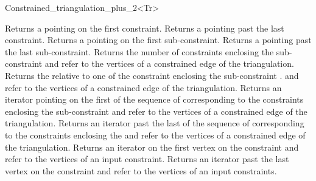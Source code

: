 \begin{ccRefClass}{Constrained_triangulation_plus_2<Tr>}
{
{Returns a  pointing on the first
constraint.}
\ccGlue
{}
{Returns a  pointing past the last
constraint.}
\ccGlue
{}
{Returns a  pointing on the first
sub-constraint.}
\ccGlue
{}
{Returns a  pointing past the last
sub-constraint.}
\ccGlue
{}
{Returns the number of constraints enclosing the sub-constraint
\ccPrecond {} and  refer to  the vertices
of a constrained edge of the triangulation.}
\ccGlue
{}
{Returns the   relative to  one of the constraint 
enclosing  the sub-constraint  .
\ccPrecond {} and  refer to  the vertices
of a constrained edge of the triangulation.}
\ccGlue
{}
{Returns an iterator pointing on the first 
of the sequence of 
corresponding to the constraints enclosing the sub-constraint
\ccPrecond {} and  refer to  the vertices
of a constrained edge of the triangulation.}
\ccGlue
{}
{Returns an iterator past the last  
of the sequence of 
corresponding to the constraints enclosing the  
\ccPrecond {} and  refer to  the vertices
of a constrained edge of the triangulation.}
\ccGlue
{}
{Returns an iterator on the first vertex on the constraint
\ccPrecond {} and  refer to  the vertices
of an input constraint.}
\ccGlue
{}
{Returns an iterator past  the last  vertex on  the constraint
\ccPrecond {} and  refer to  the vertices
of an input constraints.}


\ccSeeAlso
{} \\
 \\
 \\

}
\end{ccRefClass}
